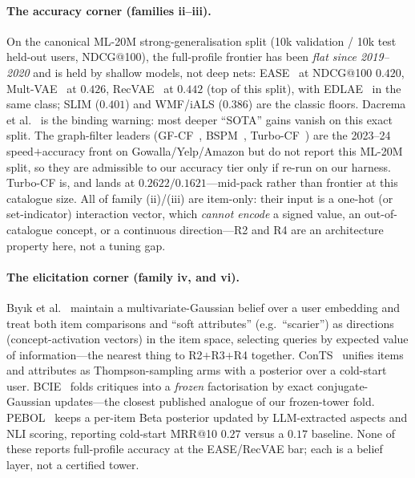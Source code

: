 \documentclass[11pt]{article}
\begin{document}
\paragraph{The accuracy corner (families ii--iii).}
On the canonical ML-20M strong-generalisation split (10k validation / 10k test held-out users, NDCG@100), the
full-profile frontier has been \emph{flat since 2019--2020} and is held by shallow models, not deep nets:
EASE~\cite{steck2019ease} at NDCG@100 $0.420$, Mult-VAE~\cite{liang2018variational} at $0.426$,
RecVAE~\cite{ren2020recvae} at $0.442$ (top of this split), with EDLAE~\cite{steck2020edlae} in the same class; SLIM
($0.401$) and WMF/iALS ($0.386$) are the classic floors. Dacrema et al.~\cite{dacrema2019progress} is the binding
warning: most deeper ``SOTA'' gains vanish on this exact split. The graph-filter leaders
(GF-CF~\cite{shen2021gfcf}, BSPM~\cite{choi2023bspm}, Turbo-CF~\cite{park2024turbocf}) are the 2023--24 speed$+$accuracy
front on Gowalla/Yelp/Amazon but do not report this ML-20M split, so they are admissible to our accuracy tier only if
re-run on our harness. Turbo-CF is, and lands at $0.2622/0.1621$---mid-pack rather than frontier at this catalogue size. All of family (ii)/(iii) are item-only: their input is a one-hot (or set-indicator) interaction
vector, which \emph{cannot encode} a signed value, an out-of-catalogue concept, or a continuous direction---R2 and R4 are an
architecture property here, not a tuning gap.

\paragraph{The elicitation corner (family iv, and vi).}
B\i y\i k et al.~\cite{biyik2023soft} maintain a multivariate-Gaussian belief over a user embedding and treat both item
comparisons and ``soft attributes'' (e.g.\ ``scarier'') as directions (concept-activation vectors) in the item space,
selecting queries by expected value of information---the nearest thing to R2$+$R3$+$R4 together.
ConTS~\cite{li2021seamlessly} unifies items and attributes as Thompson-sampling arms with a posterior over a cold-start
user. BCIE~\cite{toroghi2023bcie} folds critiques into a \emph{frozen} factorisation by exact conjugate-Gaussian
updates---the closest published analogue of our frozen-tower fold. PEBOL~\cite{austin2024bayesian} keeps a per-item Beta
posterior updated by LLM-extracted aspects and NLI scoring, reporting cold-start MRR@10 $0.27$ versus a $0.17$ baseline.
None of these reports full-profile accuracy at the EASE/RecVAE bar; each is a belief layer, not a certified tower.
\end{document}
